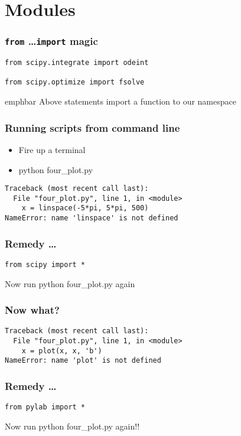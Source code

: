 \documentclass[14pt,compress]{beamer}
\newcommand{\emphbar}[1]
{\begin{beamercolorbox}[rounded=true]{emphbar} 
      {#1}
 \end{beamercolorbox}
}
\begin{document}
\section{Modules}
\begin{frame}[fragile]
  \frametitle{\texttt{from} \ldots \texttt{import} magic}
  \begin{lstlisting}
from scipy.integrate import odeint

from scipy.optimize import fsolve
  \end{lstlisting}
\emphbar{Above statements import a function to our namespace}
\end{frame}

\begin{frame}[fragile]
  \frametitle{Running scripts from command line}
  \small
  \begin{itemize}
    \item Fire up a terminal
    \item python four\_plot.py
  \end{itemize}
  \pause
  \begin{lstlisting}
Traceback (most recent call last):
  File "four_plot.py", line 1, in <module>
    x = linspace(-5*pi, 5*pi, 500)
NameError: name 'linspace' is not defined
  \end{lstlisting}
\end{frame}

\begin{frame}[fragile]
  \frametitle{Remedy \ldots}
  \begin{lstlisting}
from scipy import *
  \end{lstlisting}
\alert{Now run python four\_plot.py again}
\end{frame}

\begin{frame}[fragile]
  \frametitle{Now what?}
  \begin{lstlisting}
Traceback (most recent call last):
  File "four_plot.py", line 1, in <module>
    x = plot(x, x, 'b')
NameError: name 'plot' is not defined
  \end{lstlisting}
\end{frame}

\begin{frame}[fragile]
  \frametitle{Remedy \ldots}
  \begin{lstlisting}
from pylab import *
  \end{lstlisting}
\alert{Now run python four\_plot.py again!!}
\end{frame}
\end{document}
